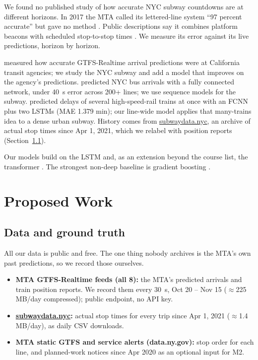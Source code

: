 \documentclass[10pt,letterpaper,twocolumn]{article}
\begin{document}
We found no published study of how accurate NYC subway countdowns are at different horizons. In 2017 the MTA called its lettered-line system ``97 percent accurate'' but gave no method \citep{ny1_2017}. Public descriptions say it combines platform beacons with scheduled stop-to-stop times \citep{sas2016,gordon2018}. We measure its error against its live predictions, horizon by horizon.

\citet{newmark2024} measured how accurate GTFS-Realtime arrival predictions were at California transit agencies; we study the NYC subway and add a model that improves on the agency's predictions. \citet{rashvand2023} predicted NYC bus arrivals with a fully connected network, under 40~s error across 200+ lines; we use sequence models for the subway. \citet*{luo2023} predicted delays of several high-speed-rail trains at once with an FCNN plus two LSTMs (MAE 1.379 min); our line-wide model applies that many-trains idea to a dense urban subway. History comes from \href{https://subwaydata.nyc/}{subwaydata.nyc}, an archive of actual stop times since Apr 1, 2021, which we relabel with position reports (Section~\ref{sec:data}).

Our models build on the LSTM \citep{hochreiter1997} and, as an extension beyond the course list, the transformer \citep{vaswani2017}. The strongest non-deep baseline is gradient boosting \citep{friedman2001}.

\section{Proposed Work}

\subsection{Data and ground truth}
\label{sec:data}

All our data is public and free. The one thing nobody archives is the MTA's own past predictions, so we record those ourselves.

\begin{itemize}
  \item \textbf{MTA GTFS-Realtime feeds (all 8):} the MTA's predicted arrivals and train position reports. We record them every 30~s, Oct 20 -- Nov 15 ($\approx$225 MB/day compressed); public endpoint, no API key.
  \item \textbf{\href{https://subwaydata.nyc/}{subwaydata.nyc}:} actual stop times for every trip since Apr 1, 2021 ($\approx$1.4 MB/day), as daily CSV downloads.
  \item \textbf{MTA static GTFS and service alerts (data.ny.gov):} stop order for each line, and planned-work notices since Apr 2020 as an optional input for M2.
\end{itemize}
\end{document}
